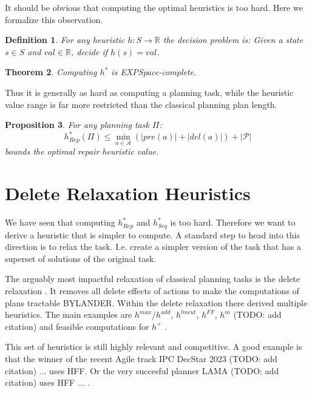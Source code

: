 \documentclass[twocolumn]{article}
\newcommand{\task}{\ensuremath{\Pi}\xspace}
\newcommand{\preds}{\ensuremath{\mathcal{P}}\xspace}
\newcommand{\acts}{\ensuremath{\mathcal{A}}\xspace}
\newcommand{\states}{\ensuremath{S}\xspace}
\newcommand{\someState}{\ensuremath{s}\xspace}
\newcommand{\prename}{\ensuremath{pre}\xspace}
\newcommand{\delname}{\ensuremath{del}\xspace}
\newcommand{\pre}[1]{\ensuremath{\prename(#1)}\xspace}
\newcommand{\del}[1]{\ensuremath{\delname(#1)}\xspace}
\newcommand{\arity}[1]{\ensuremath{|#1|}}
\newcommand{\someAct}{\ensuremath{a}\xspace}
\newcommand{\optimalHeuristic}{\ensuremath{h^{*}_{Rep}}\xspace}
\newcommand{\optimalHeuristicSeq}{\ensuremath{h^{*}_{Seq}}\xspace}
\newtheorem{theorem}{Theorem}
\newtheorem{proposition}[theorem]{Proposition}
\newtheorem{definition}[theorem]{Definition}
\begin{document}
	It should be obvious that computing the optimal heuristics is too hard. 
	Here we formalize this observation.
	
	\begin{definition}
		For any heuristic $h: \states \rightarrow \mathbb{R}$ the decision problem is:
		Given a state $\someState \in \states$ and $\mathit{val} \in \mathbb{R}$, decide if $h(\someState) = \mathit{val}$.
	\end{definition}
	
	\begin{theorem}
		Computing $h^*$ is EXPSpace-complete.
	\end{theorem}
	
	Thus it is generally as hard as computing a planning task,
	while the heuristic value range is far more restricted than the classical 
	planning plan length.
	
	\begin{proposition}
		For any planning task \task:
		$$\optimalHeuristic(\task) \leq \min_{\someAct \in \acts}(\arity{\pre{\someAct}} + \arity{\del{\someAct}}) + \arity{\preds}$$
		bounds the optimal repair heuristic value.
	\end{proposition}

	
	\section{Delete Relaxation Heuristics}
	
	
	We have seen that computing \optimalHeuristic and \optimalHeuristicSeq is too hard.
	Therefore we want to derive a heuristic that is simpler to compute.
	A standard step to head into this direction is to relax the task.
	I.e. create a simpler version of the task that has a superset of solutions of the original task.
	
	The arguably most impactful relaxation of classical planning tasks is the delete relaxation \cite{bonet:geffner:aij-01}.
 	It removes all delete effects of actions to make the computations of plans tractable BYLANDER.
	Within the delete relaxation there derived multiple heuristics.
	The main examples are
	$h^{max}$/$h^{add}$\citep{bonet:geffner:aij-01}, 
	$h^{lmcut}$\citep{helmert:domshlak:icaps-09},
	$h^{FF}$\citep{hoffmann:nebel:jair-01},
	$h^{m}$ (TODO: add citation)
	and 
	feasible computations for $h^{+}$ \citep{bonet:helmert:ecai-10,imai:fukunaga:ecai-14}.
	
	This set of heuristics is still highly relevant and competitive.
	A good example is that the winner of the recent Agile track IPC 
	DecStar 2023 (TODO: add citation) ... uses HFF.
	Or the very succesful planner
	LAMA (TODO: add citation) uses HFF ... .
	
\end{document}

